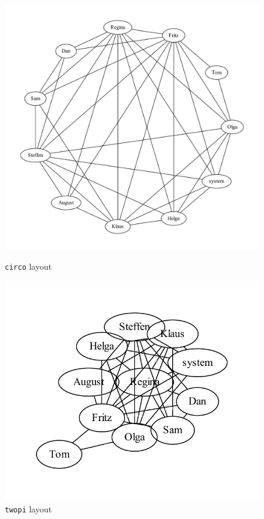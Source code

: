 \documentclass[a4paper]{scrartcl}
\newcommand{\code}[1]{\texttt{\color{code}#1}}
\begin{document}
\begin{figure}
{  \includegraphics[width=\linewidth]{gv_ca-circo}\vspace{-7mm}
  \caption{\code{circo} layout}
  \label{fig:gv-cacirco}}%
\parbox[b]{0.3\textwidth}{\centering
  \includegraphics[width=\linewidth]{gv_ca-twopi}\vspace{-7mm}
  \caption{\code{twopi} layout}
  \label{fig:gv-catwopi}
  \vspace{8mm}

}
\end{figure}
\end{document}

